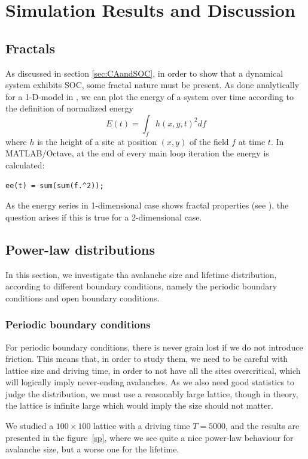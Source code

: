 \chapter{Simulation Results and Discussion}
\thispagestyle{fancy}

\section{Fractals}
As discussed in section \ref{sec:CAandSOC}, in order to show that a dynamical system exhibits SOC, some fractal nature must be present. As done analytically for a 1-D-model in \cite{fractal_avalanching}, we can plot the energy of a system over time according to the definition of normalized energy
\[
E(t) = \int_f h(x,y,t)^2 df
\]
where $h$ is the height of a site at position $(x,y)$ of the field $f$ at time $t$. In MATLAB/Octave, at the end of every main loop iteration the energy is calculated:
\begin{lstlisting}
ee(t) = sum(sum(f.^2));
\end{lstlisting}
As the energy series in 1-dimensional case shows fractal properties (see \cite{fractal_avalanching}), the question arises if this is true for a 2-dimensional case.

\section{Power-law distributions}

In this section, we investigate tha avalanche size and lifetime distribution, 
according to different boundary conditions, namely the periodic boundary conditions and open boundary conditions.



\subsection{Periodic boundary conditions}

For periodic boundary conditions, there is never grain lost if we do not introduce friction. 
This means that, in order to study them, we need to be careful with lattice size and driving time, 
in order to not have all the sites overcritical, which will logically imply never-ending avalanches.
As we  also need good statistics to judge the distribution, we must use a reasonably large lattice, 
though in theory, the lattice is infinite large which would imply the size should not matter.

We studied a $100\times 100$ lattice with a driving time $T=5000$, and the results are presented in the figure~\ref{sp}, 
where we see quite a nice power-law behaviour for avalanche size, but a worse one for the lifetime. 

